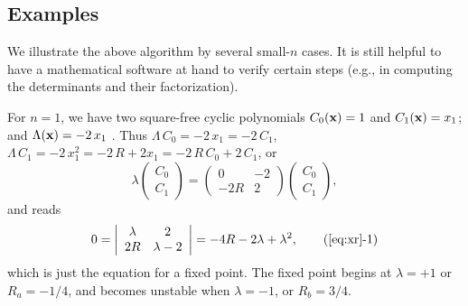 \documentclass[twocolumn]{revtex4-1}
\begin{document}
\subsection{\label{sec:examples}Examples}




We illustrate the above algorithm by several small-$n$ cases.
%
It is still helpful to have a mathematical software
  at hand to verify certain steps
  (e.g., in computing the determinants and their factorization).



For $n = 1$, we have two square-free cyclic polynomials
  $C_0(\mathbf{x}) = 1$ and $C_1(\mathbf{x}) = x_1$;
  and $\Lambda(\mathbf{x}) = -2 \, x_1$
.
Thus $\Lambda \, C_0 = -2 \, x_1 = -2 \, C_1$,
$\Lambda \, C_1 = -2 \, x_1^2 = -2 \, R + 2 x_1 = -2 \, R \, C_0 + 2 \, C_1$,
or
\[
  \lambda
  \left( \begin{array}{c}
  C_0 \\
  C_1
  \end{array} \right)
  =
  \left( \begin{array}{cc}
  0     & -2 \\
  -2R   &  2
  \end{array}\right)
  \left( \begin{array}{c}
  C_0 \\
  C_1
  \end{array} \right),
\]
and  reads
\begin{equation}
0=  \left| \begin{array}{cc}
  \lambda     & 2          \\
  2 R         & \lambda - 2
  \end{array} \right| = -4R - 2\lambda + \lambda^2,
  \tag{\ref{eq:xr}-1}
\label{eq:xr1}
\end{equation}
which is just the equation for a fixed point.
The fixed point begins at $\lambda = +1$ or $R_a = -1/4$,
  and becomes unstable when $\lambda = -1$, or $R_b = 3/4$.
\end{document}
